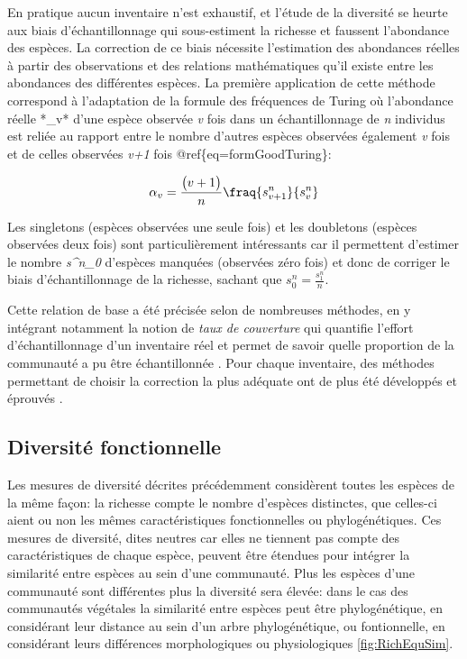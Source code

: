 \documentclass[
  11pt,
  french,
  A4paper,
  extrafontsizes,onecolumn,openright
  ]{memoir}
\begin{document}
En pratique aucun inventaire n'est exhaustif, et l'étude de la diversité
se heurte aux biais d'échantillonnage qui sous-estiment la richesse et
faussent l'abondance des espèces. La correction de ce biais nécessite
l'estimation des abondances réelles à partir des observations et des
relations mathématiques qu'il existe entre les abondances des
différentes espèces. La première application de cette méthode correspond
à l'adaptation de la formule des fréquences de Turing
\autocite{Good1953} où l'abondance réelle *\alpha\_v* d'une espèce
observée \emph{v} fois dans un échantillonnage de \emph{n} individus est
reliée au rapport entre le nombre d'autres espèces observées également
\emph{v} fois et de celles observées \emph{v+1} fois
@ref\{eq=formGoodTuring\}:

\begin{equation}
\alpha_v=\frac{\big(v+1\big)}{n}\fraq{s^n_{v+1}}{s^n_v}
\label{eq:formGoodTuring}
\end{equation}

Les singletons (espèces observées une seule fois) et les doubletons
(espèces observées deux fois) sont particulièrement intéressants car il
permettent d'estimer le nombre \emph{s\^{}n\_0} d'espèces manquées
(observées zéro fois) et donc de corriger le biais d'échantillonnage de
la richesse, sachant que \(s^n_0=\frac{s^n_1}{n}\).

Cette relation de base a été précisée selon de nombreuses méthodes, en y
intégrant notamment la notion de \emph{taux de couverture} qui quantifie
l'effort d'échantillonnage d'un inventaire réel et permet de savoir
quelle proportion de la communauté a pu être échantillonnée
\autocite{Dauby2012}. Pour chaque inventaire, des méthodes permettant de
choisir la correction la plus adéquate ont de plus été développés et
éprouvés \autocites{Chao2015}{Marcon2015b}.

\subsection{Diversité fonctionnelle}\label{diversite-fonctionnelle}

Les mesures de diversité décrites précédemment considèrent toutes les
espèces de la même façon: la richesse compte le nombre d'espèces
distinctes, que celles-ci aient ou non les mêmes caractéristiques
fonctionnelles ou phylogénétiques. Ces mesures de diversité, dites
neutres car elles ne tiennent pas compte des caractéristiques de chaque
espèce, peuvent être étendues pour intégrer la similarité entre espèces
au sein d'une communauté. Plus les espèces d'une communauté sont
différentes plus la diversité sera élevée: dans le cas des communautés
végétales la similarité entre espèces peut être phylogénétique, en
considérant leur distance au sein d'un arbre phylogénétique, ou
fontionnelle, en considérant leurs différences morphologiques ou
physiologiques \ref{fig:RichEquSim}.
\end{document}
